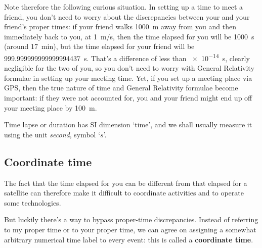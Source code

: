 Note therefore the following curious situation. In setting up a time to meet a friend, you don't need to worry about the discrepancies between your and your friend's proper times: if your friend walks \qty{1000}{m} away from you and then immediately back to you, at \qty{1}{m/s}, then the time elapsed for you will be \qty{1000}{s} (around \qty{17}{min}), but the time elapsed for your friend will be \qty{999.999999999999994437}{s}. That's a difference of less than \qty{e-14}{s}, clearly negligible for the two of you, so you don't need to worry with General Relativity formulae in setting up your meeting time. Yet, if you set up a meeting place via GPS, then the true nature of time and General Relativity formulae become important: if they were not accounted for, you and your friend might end up off your meeting place by \qty{100}{m}.

Time lapse or duration has SI dimension \enquote*{\textsf{time}}, and we shall usually measure it using the unit \emph{second}, symbol \enquote*{$\unit{s}$}.



\subsection{Coordinate time}
\label{sec:coord_time}

The fact that the time elapsed for you can be different from that elapsed for a satellite can therefore make it difficult to coordinate activities and to operate some technologies.

But luckily there's a way to bypass proper-time discrepancies. Instead of referring to my proper time or to your proper time, we can agree on assigning a somewhat arbitrary numerical time label to every event: this is called a \textbf{coordinate time}.


